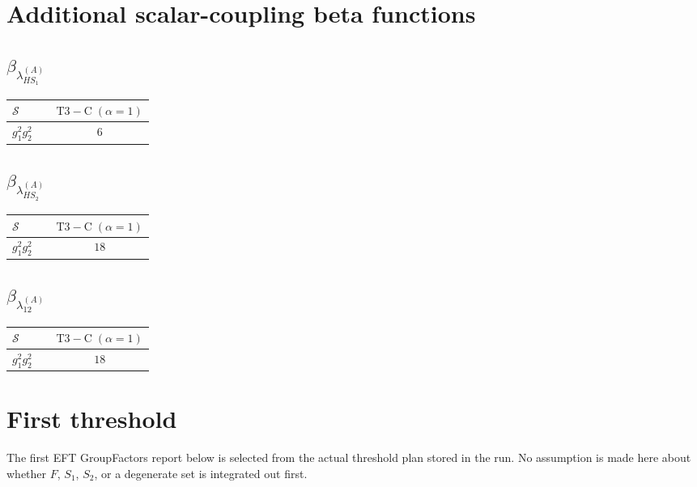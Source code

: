 \documentclass[9pt]{article}
\begin{document}
\section*{Additional scalar-coupling beta functions}
\subsection*{$ \beta_{\lambda_{HS_1}^{(A)}} $}
\begin{longtable}{@{}p{0.31\linewidth}c@{}}
\toprule
$\mathcal{S}$ & $ \mathrm{T3-C}\;(\alpha=1) $ \\
\midrule
$ g_1^2g_2^2 $ & $ 6 $ \\
\bottomrule
\end{longtable}
\subsection*{$ \beta_{\lambda_{HS_2}^{(A)}} $}
\begin{longtable}{@{}p{0.31\linewidth}c@{}}
\toprule
$\mathcal{S}$ & $ \mathrm{T3-C}\;(\alpha=1) $ \\
\midrule
$ g_1^2g_2^2 $ & $ 18 $ \\
\bottomrule
\end{longtable}
\subsection*{$ \beta_{\lambda_{12}^{(A)}} $}
\begin{longtable}{@{}p{0.31\linewidth}c@{}}
\toprule
$\mathcal{S}$ & $ \mathrm{T3-C}\;(\alpha=1) $ \\
\midrule
$ g_1^2g_2^2 $ & $ 18 $ \\
\bottomrule
\end{longtable}
\section*{First threshold}
The first EFT GroupFactors report below is selected from the actual threshold plan stored in the run.  No assumption is made here about whether $F$, $S_1$, $S_2$, or a degenerate set is integrated out first.
\end{document}
